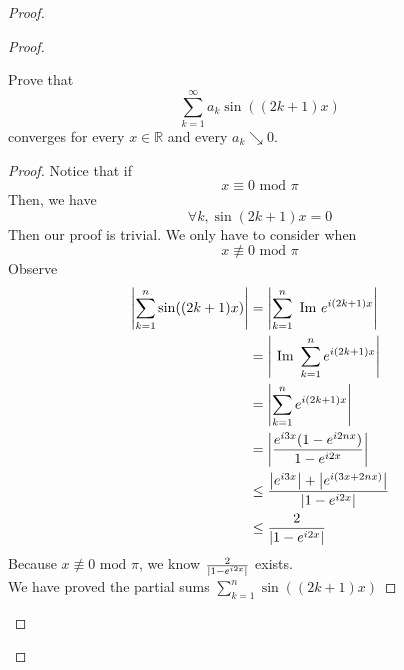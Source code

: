 \documentclass{report}
\begin{document}
\begin{proof}
\begin{proof}
\begin{question}{}{}
Prove that 
\[
\sum_{k=1}^{\infty} a_k \sin((2k + 1)x)
\]
converges for every \( x \in \mathbb{R} \) and every \( a_k \searrow 0 \).
\end{question}
\begin{proof}
Notice that if 
\begin{equation}
x\equiv 0\text{ mod $\pi$}
\end{equation}
Then, we have 
\begin{equation}
\forall k,\sin(2k+1)x=0
\end{equation}
Then our proof is trivial. We only have to consider when 
\begin{equation}
x\not\equiv 0\text{ mod }\pi
\end{equation}
Observe
\begin{align}
  \left|\sum_{k=1}^n \sin((2k+1)x)\right|&= \left|\sum_{k=1}^n \text{ Im }e^{i(2k+1)x}\right|\\
  &=\left|\text{ Im }\sum_{k=1}^n e^{i(2k+1)x}\right|\\
  &=\left|\sum_{k=1}^n e^{i(2k+1)x}\right|\\
  &=\left|\frac{e^{i3x}(1-e^{i2nx})}{1-e^{i2x}}\right|\\
  &\leq \frac{\left|e^{i3x}\right|+\left|e^{i(3x+2nx)}\right|}{\left|1-e^{i2x}\right|}\\
  &\leq \frac{2}{\left|1-e^{i 2x}\right|}
\end{align}
Because $x\not\equiv 0\text{ mod $\pi$}$, we know $\frac{2}{\left|1-e^{i2x}\right|}$ exists.\\

We have proved the partial sums $\sum_{k=1}^n \sin((2k+1)x)$

\end{proof}


\end{proof}
\end{proof}
\end{document}
